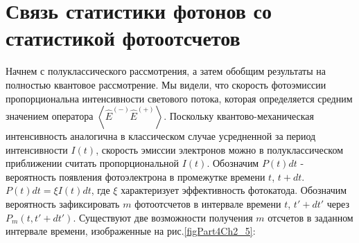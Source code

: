 \section{Связь статистики фотонов со статистикой фотоотсчетов}
Начнем с полуклассического рассмотрения, а затем обобщим результаты на
полностью квантовое рассмотрение. Мы видели, что скорость фотоэмиссии
пропорциональна интенсивности светового потока, которая определяется
средним значением оператора $\left<\hat{E}^{(-)}\hat{E}^{(+)}\right>$. 
Поскольку квантово-механическая
интенсивность аналогична в классическом случае усредненной за период 
интенсивности $I\left(t\right)$,  скорость эмиссии электронов можно в
полуклассическом приближении считать пропорциональной
$I\left(t\right)$. Обозначим $P\left(t\right)dt$ - вероятность
появления фотоэлектрона в промежутке времени $t$, $t + dt$.  
$P\left(t\right)dt = \xi I\left(t\right)dt$,  где $\xi$ характеризует
эффективность фотокатода. Обозначим вероятность зафиксировать $m$
фотоотсчетов в интервале времени $t$, $t' + dt'$  через $P_m\left(t,
t' + dt'\right)$. Существуют две возможности получения $m$ отсчетов в
заданном интервале времени, изображенные на рис.\ref{figPart4Ch2_5}: 



